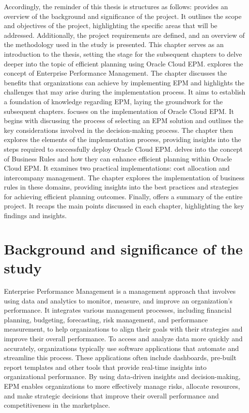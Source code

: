\documentclass[12pt,a4paper,openright,twoside]{book}
\begin{document}
Accordingly, the reminder of this thesis is structures as follows:
%
 provides an overview of the background and significance of the project.
%
It outlines the scope and objectives of the project, highlighting the specific areas that will be addressed. 
%
Additionally, the project requirements are defined, and an overview of the methodology used in the study is presented. 
%
This chapter serves as an introduction to the thesis, setting the stage for the subsequent chapters to delve deeper into the topic of efficient planning using Oracle Cloud EPM.
%
 explores the concept of Enterprise Performance Management. 
%
The chapter discusses the benefits that organizations can achieve by implementing EPM and highlights the challenges that may arise during the implementation process. 
%
It aims to establish a foundation of knowledge regarding EPM, laying the groundwork for the subsequent chapters.
%
 focuses on the implementation of Oracle Cloud EPM. 
%
It begins with discussing the process of selecting an EPM solution and outlines the key considerations involved in the decision-making process. 
%
The chapter then explores the elements of the implementation process, providing insights into the steps required to successfully deploy Oracle Cloud EPM. 
%
 delves into the concept of Business Rules and how they can enhance efficient planning within Oracle Cloud EPM. 
%
It examines two practical implementations: cost allocation and intercompany management. 
%
The chapter explores the implementation of business rules in these domains, providing insights into the best practices and strategies for achieving efficient planning outcomes. 
%
Finally,  offers a summary of the entire project. 
%
It recaps the main points discussed in each chapter, highlighting the key findings and insights. 

\section{Background and significance of the study}

Enterprise Performance Management is a management approach that involves using data and analytics to monitor, measure, and improve an organization's performance. 
%
It integrates various management processes, including financial planning, budgeting, forecasting, risk management, and performance measurement, to help organizations to align their goals with their strategies and improve their overall performance.
%
To access and analyze data more quickly and accurately, organizations typically use software applications that automate and streamline this process.
%
These applications often include dashboards, pre-built report templates and other tools that provide real-time insights into organizational performance.
%
By using data-driven insights and decision-making, EPM enables organizations to more effectively manage risks, allocate resources, and make strategic decisions that improve their overall performance and competitiveness in the marketplace.
\end{document}
